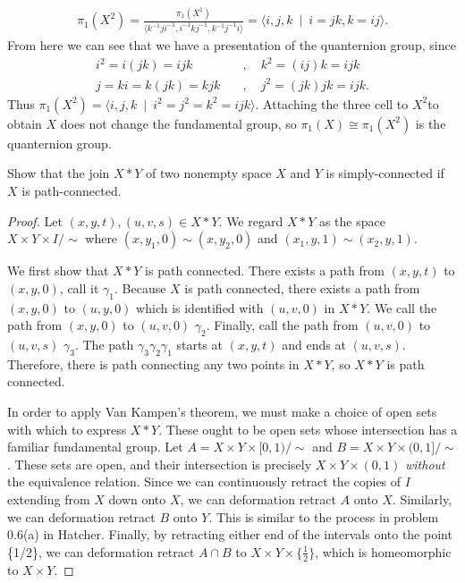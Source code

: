 \begin{homework}[e]
\begin{prf}
\begin{align*}
      \pi_1(X^2) = \frac{\pi_1(X^1)}{\langle k^{-1}ji^{-1}, i^{-1}kj^{-1},k^{-1}j^{-1}i \rangle} = \langle i,j,k ~\mid~ i=jk, k = ij \rangle.
    \end{align*}
    From here we can see that we have a presentation of the quanternion group, since
    \begin{align*}
      i^2 = i(jk) = ijk \hspace{1em}&,\hspace{1em} k^2 = (ij)k = ijk \\
      j = ki = k(jk) = kjk \hspace{1em}&,\hspace{1em} j^2 = (jk)jk = ijk.
    \end{align*}
    Thus $\pi_1(X^2) = \langle i,j,k ~\mid~ i^2 = j^2 = k^2 = ijk \rangle$. Attaching the three cell to $X^2$to obtain $X$ does not change the fundamental group, so $\pi_1(X) \cong \pi_1(X^2)$ is the quanternion group.
  \end{prf}
   Show that the join $X*Y$ of two nonempty space $X$ and $Y$ is simply-connected if $X$ is path-connected.
\begin{proof}
    Let $(x,y,t),(u,v,s) \in X * Y$. We regard $X * Y$ as the space $X \times Y \times I / \sim$ where $(x,y_1,0) \sim (x,y_2,0)$ and $(x_1,y,1) \sim (x_2,y,1)$.
    
    We first show that $X * Y$ is path connected.  There exists a path from $(x,y,t)$ to $(x,y,0)$, call it $\gamma_1$. Because $X$ is path connected, there exists a path from $(x,y,0)$ to $(u,y,0)$ which is identified with $(u,v,0)$ in $X * Y$. We call the path from $(x,y,0)$ to $(u,v,0)$ $\gamma_2$. Finally, call the path from $(u,v,0)$ to $(u,v,s)$ $\gamma_3$. The path $\gamma_3 \gamma_2 \gamma_1$ starts at $(x,y,t)$ and ends at $(u,v,s)$. Therefore, there is path connecting any two points in $X*Y$, so $X*Y$ is path connected.  
    
    In order to apply Van Kampen's theorem, we must make a choice of open sets with which to express $X * Y$. These ought to be open sets whose intersection has a familiar fundamental group. Let $A = X \times Y \times [0,1) / \sim$ and $B = X \times Y \times (0,1] / \sim$. These sets are open, and their intersection is precisely $X \times Y \times (0,1)$ \emph{without} the equivalence relation. Since we can continuously retract the copies of $I$ extending from $X$ down onto $X$, we can deformation retract $A$ onto $X$. Similarly, we can deformation retract $B$ onto $Y$. This is similar to the process in problem 0.6(a) in Hatcher. Finally, by retracting either end of the intervals onto the point \{1/2\}, we can deformation retract $A \cap B$ to $X \times Y \times \{\frac{1}{2}\}$, which is homeomorphic to $X \times Y$. 
    

\end{proof}
\end{homework}
